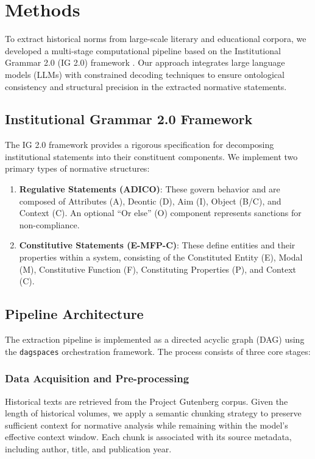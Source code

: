 \section{Methods}
\label{sec:methods}

To extract historical norms from large-scale literary and educational corpora, we developed a multi-stage computational pipeline based on the Institutional Grammar 2.0 (IG 2.0) framework \cite{frantz2021institutional}. Our approach integrates large language models (LLMs) with constrained decoding techniques to ensure ontological consistency and structural precision in the extracted normative statements.

\subsection{Institutional Grammar 2.0 Framework}
The IG 2.0 framework provides a rigorous specification for decomposing institutional statements into their constituent components. We implement two primary types of normative structures:

\begin{enumerate}
    \item \textbf{Regulative Statements (ADICO)}: These govern behavior and are composed of Attributes (A), Deontic (D), Aim (I), Object (B/C), and Context (C). An optional ``Or else'' (O) component represents sanctions for non-compliance.
    \item \textbf{Constitutive Statements (E-MFP-C)}: These define entities and their properties within a system, consisting of the Constituted Entity (E), Modal (M), Constitutive Function (F), Constituting Properties (P), and Context (C).
\end{enumerate}

\subsection{Pipeline Architecture}
The extraction pipeline is implemented as a directed acyclic graph (DAG) using the \texttt{dagspaces} orchestration framework. The process consists of three core stages:

\subsubsection{Data Acquisition and Pre-processing}
Historical texts are retrieved from the Project Gutenberg corpus. Given the length of historical volumes, we apply a semantic chunking strategy to preserve sufficient context for normative analysis while remaining within the model's effective context window. Each chunk is associated with its source metadata, including author, title, and publication year.

